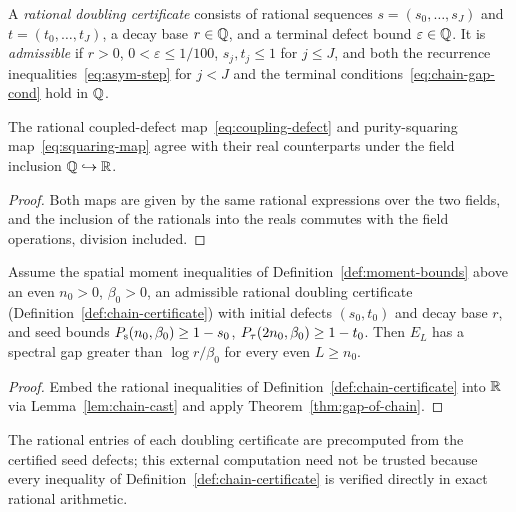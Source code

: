 \begin{definition}
  \label{def:chain-certificate}
  \leanok
  A \emph{rational doubling certificate} consists of rational sequences \(s = (s_0, \dots, s_J)\)
  and \(t = (t_0, \dots, t_J)\), a decay base \(r \in \mathbb{Q}\), and a terminal defect bound
  \(\varepsilon \in \mathbb{Q}\). It is \emph{admissible} if \(r > 0\), \(0 < \varepsilon \le 1/100\),
  \(s_j, t_j \le 1\) for \(j \le J\), and both the recurrence inequalities~\eqref{eq:asym-step} for
  \(j < J\) and the terminal conditions~\eqref{eq:chain-gap-cond} hold in \(\mathbb{Q}\).
\end{definition}

\begin{lemma}
  \label{lem:chain-cast}
  \leanok
  The rational coupled-defect map~\eqref{eq:coupling-defect} and purity-squaring
  map~\eqref{eq:squaring-map} agree with their real counterparts under the field inclusion
  \(\mathbb{Q} \hookrightarrow \mathbb{R}\).
\end{lemma}
\begin{proof}
  \leanok
  Both maps are given by the same rational expressions over the two fields, and the inclusion of
  the rationals into the reals commutes with the field operations, division included.
\end{proof}

\begin{theorem}
  \label{thm:gap-of-chain-certificate}
  \leanok
  Assume the spatial moment inequalities of Definition~\ref{def:moment-bounds} above an even
  \(n_0 > 0\), \(\beta_0 > 0\), an admissible rational doubling certificate
  (Definition~\ref{def:chain-certificate}) with initial defects \((s_0, t_0)\) and decay base \(r\),
  and seed bounds \(P_{\mathrm{s}}(n_0, \beta_0) \ge 1 - s_0\), \(P_{\tau}(2n_0, \beta_0) \ge 1 - t_0\). Then
  \(E_L\) has a spectral gap greater than \(\log r / \beta_0\) for every even \(L \ge n_0\).
\end{theorem}
\begin{proof}
  \leanok
  Embed the rational inequalities of Definition~\ref{def:chain-certificate} into \(\mathbb{R}\) via
  Lemma~\ref{lem:chain-cast} and apply Theorem~\ref{thm:gap-of-chain}.
\end{proof}

\begin{remark}
  The rational entries of each doubling certificate are precomputed from the certified seed
  defects; this external computation need not be trusted because every inequality of
  Definition~\ref{def:chain-certificate} is verified directly in exact rational arithmetic.
\end{remark}
